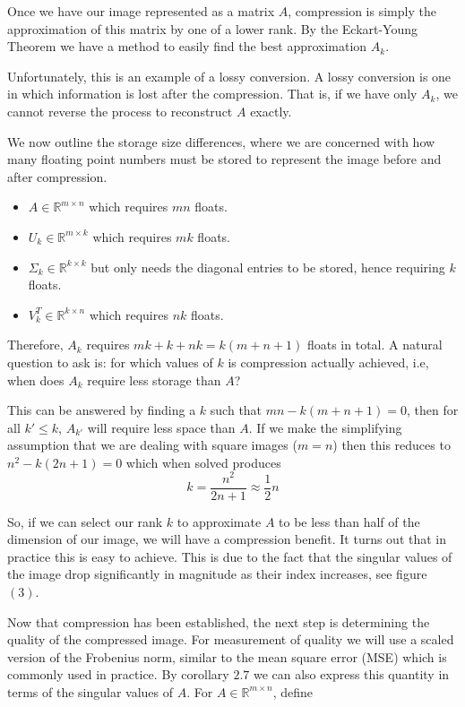 \documentclass[a4paper]{article}
\begin{document}
Once we have our image represented as a matrix $A$, compression is simply the approximation of this matrix by one of a lower rank.  By the Eckart-Young Theorem we have a method to easily find the best approximation $A_k$.

Unfortunately, this is an example of a lossy conversion.  A lossy conversion is one in which information is lost after the compression.  That is, if we have only $A_k$, we cannot reverse the process to reconstruct $A$ exactly.

We now outline the storage size differences, where we are concerned with how many floating point numbers must be stored to represent the image before and after compression.

\begin{itemize}
\item $A\in \mathbb{R}^{m\times n}$ which requires $mn$ floats.
\item $U_k\in \mathbb{R}^{m\times k}$ which requires $mk$ floats.
\item $\Sigma_k \in \mathbb{R}^{k\times k}$ but only needs the diagonal entries to be stored, hence requiring $k$ floats.
\item $V_k^T\in \mathbb{R}^{k\times n}$ which requires $nk$ floats.
\end{itemize}

Therefore, $A_k$ requires $mk+k+nk = k(m+n+1)$ floats in total.  A natural question to ask is: for which values of $k$ is compression actually achieved, i.e, when does $A_k$ require less storage than $A$?

\pagebreak

This can be answered by finding a $k$ such that $mn - k(m+n+1)=0$, then for all $k' \leq k$, $A_{k'}$ will require less space than $A$.  If we make the simplifying assumption that we are dealing with square images ($m=n$) then this reduces to
$n^2 - k(2n+1)=0$ which when solved produces
$$k=\frac{n^2}{2n+1} \approx \frac{1}{2}n$$


So, if we can select our rank $k$ to approximate $A$ to be less than half of the dimension of our image, we will have a compression benefit.  It turns out that in practice this is easy to achieve.  This is due to the fact that the singular values of the image drop significantly in magnitude as their index increases, see figure $(3)$.

Now that compression has been established, the next step is determining the quality of the compressed image.  For measurement of quality we will use a scaled version of the Frobenius norm, similar to the mean square error (MSE) which is commonly used in practice.  By corollary $2.7$ we can also express this quantity in terms of the singular values of $A$.  For $A\in \mathbb{R}^{m\times n}$, define
\end{document}

